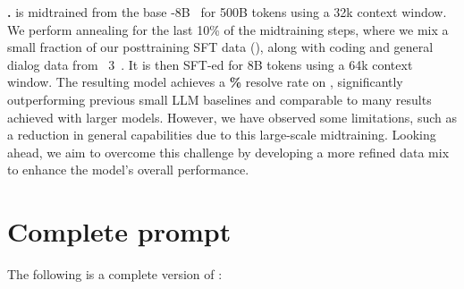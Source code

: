 \textbf{\oursmid[8].}
\oursmid[8] is midtrained from the base -8B~\cite{llama31} for 500B tokens using a 32k context window. We perform annealing for the last 10\% of the midtraining steps, where we mix a small fraction of our posttraining SFT data (), along with coding and general dialog data from \llama~3~\cite{llama31}.
It is then SFT-ed for 8B tokens using a 64k context window.
The resulting model achieves a \textbf{\swebfinalsmall{}\%} resolve rate on \swebverified, significantly outperforming previous small LLM baselines and comparable to many results achieved with larger models.
However, we have observed some limitations, such as a reduction in general capabilities due to this large-scale midtraining.
Looking ahead, we aim to overcome this challenge by developing a more refined data mix to enhance the model's overall performance.

\section{Complete prompt}
\label{sec:apd:fullprompt}

The following is a complete version of :

